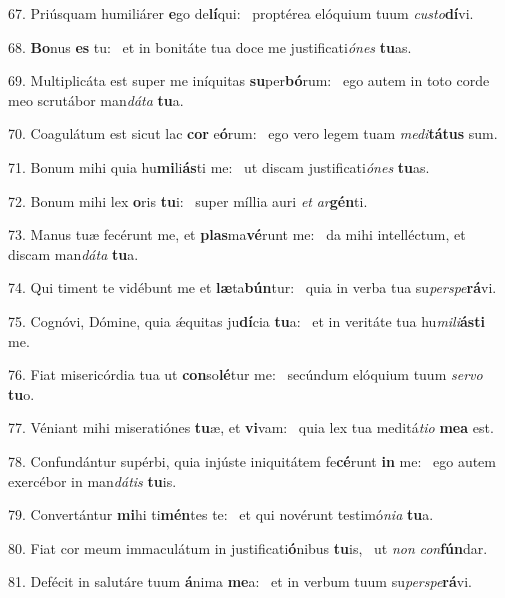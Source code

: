 67. Priúsquam humiliárer \textbf{e}go de\textbf{lí}qui: \ast\  proptérea elóquium tuum \textit{cus}\textit{to}\textbf{dí}vi.\

68. \textbf{Bo}nus \textbf{es} tu: \ast\  et in bonitáte tua doce me justificati\textit{ó}\textit{nes} \textbf{tu}as.\

69. Multiplicáta est super me iníquitas \textbf{su}per\textbf{bó}rum: \ast\  ego autem in toto corde meo scrutábor man\textit{dá}\textit{ta} \textbf{tu}a.\

70. Coagulátum est sicut lac \textbf{cor} e\textbf{ó}rum: \ast\  ego vero legem tuam \textit{me}\textit{di}\textbf{tá}\textbf{tus} sum.\

71. Bonum mihi quia hu\textbf{mi}li\textbf{ás}ti me: \ast\  ut discam justificati\textit{ó}\textit{nes} \textbf{tu}as.\

72. Bonum mihi lex \textbf{o}ris \textbf{tu}i: \ast\  super míllia auri \textit{et} \textit{ar}\textbf{gén}ti.\

73. Manus tuæ fecérunt me, et \textbf{plas}ma\textbf{vé}runt me: \ast\  da mihi intelléctum, et discam man\textit{dá}\textit{ta} \textbf{tu}a.\

74. Qui timent te vidébunt me et \textbf{læ}ta\textbf{bún}tur: \ast\  quia in verba tua su\textit{per}\textit{spe}\textbf{rá}vi.\

75. Cognóvi, Dómine, quia ǽquitas ju\textbf{dí}cia \textbf{tu}a: \ast\  et in veritáte tua hu\textit{mi}\textit{li}\textbf{ás}\textbf{ti} me.\

76. Fiat misericórdia tua ut \textbf{con}so\textbf{lé}tur me: \ast\  secúndum elóquium tuum \textit{ser}\textit{vo} \textbf{tu}o.\

77. Véniant mihi miseratiónes \textbf{tu}æ, et \textbf{vi}vam: \ast\  quia lex tua meditá\textit{ti}\textit{o} \textbf{me}\textbf{a} est.\

78. Confundántur supérbi, quia injúste iniquitátem fe\textbf{cé}runt \textbf{in} me: \ast\  ego autem exercébor in man\textit{dá}\textit{tis} \textbf{tu}is.\

79. Convertántur \textbf{mi}hi ti\textbf{mén}tes te: \ast\  et qui novérunt testimó\textit{ni}\textit{a} \textbf{tu}a.\

80. Fiat cor meum immaculátum in justificati\textbf{ó}nibus \textbf{tu}is, \ast\  ut \textit{non} \textit{con}\textbf{fún}dar.\

81. Defécit in salutáre tuum \textbf{á}nima \textbf{me}a: \ast\  et in verbum tuum su\textit{per}\textit{spe}\textbf{rá}vi.\

